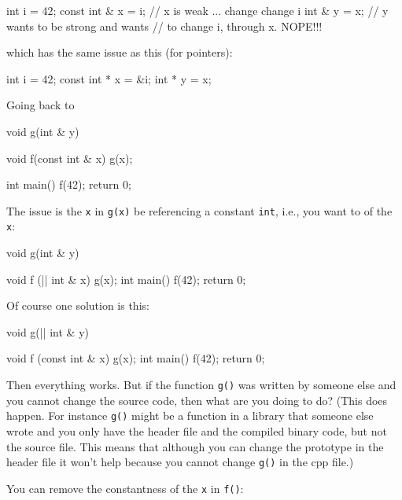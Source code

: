 \begin{console}
int i = 42;
const int & x = i;   // x is weak ... change change i
int & y = x;         // y wants to be strong and wants
                     // to change i, through x. NOPE!!!
\end{console}

which has the same issue as this (for pointers):

\begin{console}
int i = 42;
const int * x = &i;
int * y = x;
\end{console}

Going back to

\begin{console}
void g(int & y)
{}

void f(const int & x)
{    
     g(x);
}

int main()
{   
    f(42);
    return 0;
}
\end{console}

The issue is the \texttt{x} in \texttt{g(x)}  be referencing a constant \texttt{int}, i.e., you want to  of the \texttt{x}:

\begin{consolethree}[escapeinside=||]
void g(int & y)
{}

void f (|| int & x)
{    
     g(x);
}
int main()
{   
    f(42);
    return 0;
}
\end{consolethree}

Of course one solution is this:
\begin{consolethree}[escapeinside=||]
void g(|| int & y)
{}

void f (const int & x)
{    
     g(x);
}
int main()
{   
    f(42);
    return 0;
}
\end{consolethree}
Then everything works. But if the function \texttt{g()} was written by someone else and you cannot change the source code, then what are you doing to do? (This does happen. For instance \texttt{g()} might be a function in a library that someone else wrote and you only have the header file and the compiled binary code, but not the source file. This means that although you can change the prototype in the header file it won't help because you cannot change \texttt{g()} in the cpp file.)

You can remove the constantness of the \texttt{x} in \texttt{f()}:

